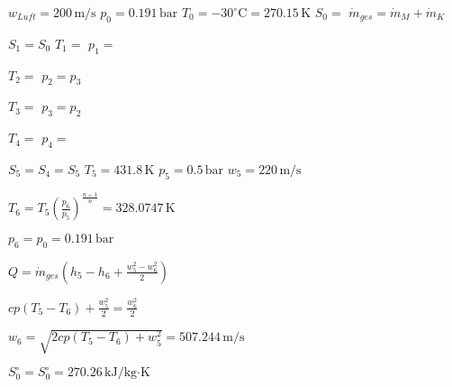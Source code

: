 \( w_{Luft} = 200 \, \text{m/s} \)  
\( p_0 = 0.191 \, \text{bar} \)  
\( T_0 = -30^\circ \text{C} = 270.15 \, \text{K} \)  
\( S_0 = \)  
\( \dot{m}_{ges} = \dot{m}_M + \dot{m}_K \)  

\( S_1 = S_0 \)  
\( T_1 = \)  
\( p_1 = \)  

\( T_2 = \)  
\( p_2 = p_3 \)  

\( T_3 = \)  
\( p_3 = p_2 \)  

\( T_4 = \)  
\( p_4 = \)  

\( S_5 = S_4 = S_5 \)  
\( T_5 = 431.8 \, \text{K} \)  
\( p_5 = 0.5 \, \text{bar} \)  
\( w_5 = 220 \, \text{m/s} \)  

\( T_6 = T_5 \left( \frac{p_6}{p_5} \right)^{\frac{n-1}{n}} = 328.0747 \, \text{K} \)  

\( p_6 = p_0 = 0.191 \, \text{bar} \)  

\( Q = \dot{m}_{ges} \left( h_5 - h_6 + \frac{w_5^2 - w_6^2}{2} \right) \)  

\( cp (T_5 - T_6) + \frac{w_5^2}{2} = \frac{w_6^2}{2} \)  

\( w_6 = \sqrt{2cp (T_5 - T_6) + w_5^2} = 507.244 \, \text{m/s} \)  

\( S_0^\circ = S_0^\circ = 270.26 \, \text{kJ/kg·K} \)